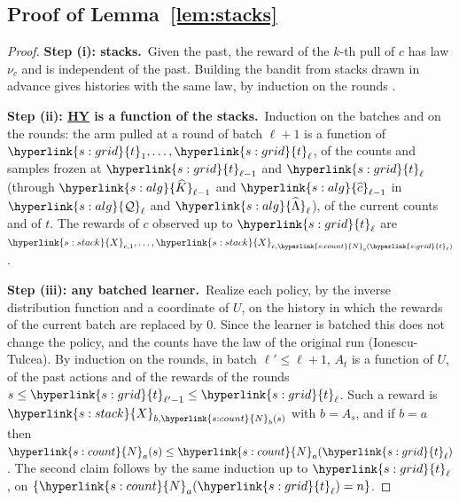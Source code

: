 \documentclass[10pt]{article}
\newcommand{\sy}[2]{{\hyperlink{#1}{#2}}}
\newcommand{\1}{\mathbf{1}}
\newcommand{\Ng}{\sy{s:count}{N}}
\newcommand{\Xs}{\sy{s:stack}{X}}
\newcommand{\tl}{\sy{s:grid}{t}}
\newcommand{\HY}{\hyperref[def:hy]{\textup{HY}}}
\newcommand{\Ld}{\sy{s:alg}{\widehat c}}
\newcommand{\Kh}{\sy{s:alg}{\widehat K}}
\newcommand{\Qp}{\sy{s:alg}{\mathcal Q}}
\newcommand{\Lh}{\sy{s:alg}{\widehat\Lambda}}
\newcommand{\stp}[2]{\par\medskip\noindent\textbf{Step #1: #2.}\ }
\begin{document}
\subsection{Proof of Lemma~\ref{lem:stacks}}\label{sec:pf-lem:stacks}
\begin{proof}
\stp{(i)}{stacks}Given the past, the reward of the $k$-th pull of $c$ has law $\nu_c$ and is independent of the past. Building the bandit from stacks drawn in advance gives
histories with the same law, by induction on the rounds \citep[Section~4.6]{LS}.

\stp{(ii)}{\HY{} is a function of the stacks}Induction on the batches and on the rounds: the arm pulled at a round of batch $\ell+1$ is a function of $\tl_1,\dots,\tl_\ell$, of
the counts and samples frozen at $\tl_{\ell-1}$ and $\tl_\ell$ (through $\Kh_{\ell-1}$ and $\Ld_{\ell-1}$ in $\Qp_\ell$ and $\Lh_\ell$), of the current counts and of $t$. The
rewards of $c$ observed up to $\tl_\ell$ are $\Xs_{c,1},\dots,\Xs_{c,\Ng_c(\tl_\ell)}$.

\stp{(iii)}{any batched learner}Realize each policy, by the inverse distribution function and a coordinate of $U$, on the history in which the rewards of the current batch
are replaced by $0$. Since the learner is batched this does not change the policy, and the counts have the law of the original run (Ionescu-Tulcea). By induction on the
rounds, in batch $\ell'\le\ell+1$, $A_t$ is a function of $U$, of the past actions and of the rewards of the rounds $s\le\tl_{\ell'-1}\le\tl_\ell$. Such a reward is
$\Xs_{b,\Ng_b(s)}$ with $b=A_s$, and if $b=a$ then $\Ng_a(s)\le\Ng_a(\tl_\ell)$. The second claim follows by the same induction up to $\tl_\ell$, on $\{\Ng_a(\tl_\ell)=n\}$.
\end{proof}
\end{document}
